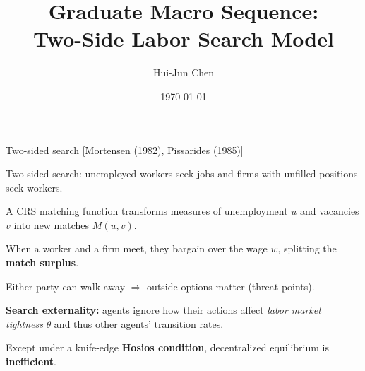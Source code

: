 \documentclass[aspectratio=169,xcolor=dvipsnames]{beamer}
\title[Lecture 5]{Graduate Macro Sequence:\\ Two-Side Labor Search Model}
\author[Hui-Jun Chen]{Hui-Jun Chen}
\institute[]{National Tsing Hua University\\ Department of Economics}
\date{\today}
\let\tempone\itemize
\let\temptwo\enditemize
\renewenvironment{itemize}{\tempone\addtolength{\itemsep}{\fill}}{\temptwo}
\begin{document}
\begin{frame}
    \titlepage
\end{frame}


\begin{frame}{Two-sided search [Mortensen (1982), Pissarides (1985)]}
\label{slide:MP_25_Intro}
\small
\begin{itemize}
    \item Two-sided search: unemployed workers seek jobs and firms with unfilled positions seek workers.
    \item A CRS matching function transforms measures of unemployment \(u\) and vacancies \(v\) into new matches \(M(u,v)\).
    \item When a worker and a firm meet, they bargain over the wage \(w\), splitting the \textbf{match surplus}.
    \item Either party can walk away \(\Rightarrow\) outside options matter (threat points).
    \item \textbf{Search externality:} agents ignore how their actions affect \emph{labor market tightness} \(\theta\) and thus other agents' transition rates.
    \item Except under a knife-edge \textbf{Hosios condition}, decentralized equilibrium is \textbf{inefficient}.
\end{itemize}
\end{frame}
\end{document}
